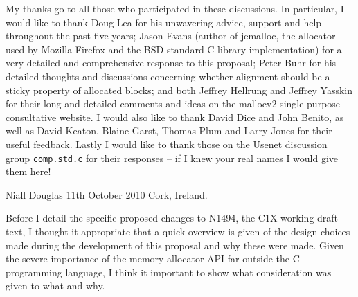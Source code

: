 \documentclass[wd]{isov2}
\begin{document}
{\begin{foreword}
My thanks go to all those who participated in these discussions. In particular, I would like to thank Doug Lea for his unwavering advice, support and help throughout the past five years; Jason Evans (author of jemalloc, the allocator used by Mozilla Firefox and the BSD standard C library implementation) for a very detailed and comprehensive response to this proposal; Peter Buhr for his detailed thoughts and discussions concerning whether alignment should be a sticky property of allocated blocks; and both Jeffrey Hellrung and Jeffrey Yasskin for their long and detailed comments and ideas on the mallocv2 single purpose consultative website. I would also like to thank David Dice and John Benito, as well as David Keaton, Blaine Garst, Thomas Plum and Larry Jones for their useful feedback. Lastly I would like to thank those on the Usenet discussion group \texttt{comp.std.c} for their responses -- if I knew your real names I would give them here!

\begin{flushleft}
Niall Douglas\linebreak
11th October 2010\linebreak
Cork, Ireland.
\end{flushleft}
\end{foreword}

\begin{introduction}
Before I detail the specific proposed changes to N1494, the C1X working draft text, I thought it appropriate that a quick overview is given of the design choices made during the development of this proposal and why these were made. Given the severe importance of the memory allocator API far outside the C programming language, I think it important to show what consideration was given to what and why.


\end{introduction}}
\end{document}
